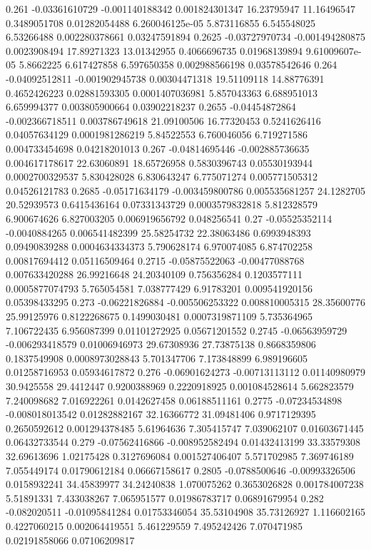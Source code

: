 {0.261 -0.03361610729 -0.001140188342 0.001824301347 16.23795947 11.16496547 0.3489051708 0.01282054488 6.260046125e-05 5.873116855 6.545548025 6.53266488 0.002280378661 0.03247591894
0.2625 -0.03727970734 -0.001494280875 0.0023908494 17.89271323 13.01342955 0.4066696735 0.01968139894 9.61009607e-05 5.8662225 6.617427858 6.597650358 0.002988566198 0.03578542646
0.264 -0.04092512811 -0.001902945738 0.00304471318 19.51109118 14.88776391 0.4652426223 0.02881593305 0.0001407036981 5.857043363 6.688951013 6.659994377 0.003805900664 0.03902218237
0.2655 -0.04454872864 -0.002366718511 0.003786749618 21.09100506 16.77320453 0.5241626416 0.04057634129 0.0001981286219 5.84522553 6.760046056 6.719271586 0.004733454698 0.04218201013
0.267 -0.04814695446 -0.002885736635 0.004617178617 22.63060891 18.65726958 0.5830396743 0.05530193944 0.0002700329537 5.830428028 6.830643247 6.775071274 0.005771505312 0.04526121783
0.2685 -0.05171634179 -0.003459800786 0.005535681257 24.1282705 20.52939573 0.6415436164 0.07331343729 0.0003579832818 5.812328579 6.900674626 6.827003205 0.006919656792 0.048256541
0.27 -0.05525352114 -0.0040884265 0.006541482399 25.58254732 22.38063486 0.6993948393 0.09490839288 0.0004634334373 5.790628174 6.970074085 6.874702258 0.00817694412 0.05116509464
0.2715 -0.05875522063 -0.00477088768 0.007633420288 26.99216648 24.20340109 0.756356284 0.1203577111 0.0005877074793 5.765054581 7.038777429 6.91783201 0.009541920156 0.05398433295
0.273 -0.06221826884 -0.005506253322 0.008810005315 28.35600776 25.99125976 0.8122268675 0.1499030481 0.0007319871109 5.735364965 7.106722435 6.956087399 0.01101272925 0.05671201552
0.2745 -0.06563959729 -0.006293418579 0.01006946973 29.67308936 27.73875138 0.8668359806 0.1837549908 0.0008973028843 5.701347706 7.173848899 6.989196605 0.01258716953 0.05934617872
0.276 -0.06901624273 -0.00713113112 0.01140980979 30.9425558 29.4412447 0.9200388969 0.2220918925 0.001084528614 5.662823579 7.240098682 7.016922261 0.0142627458 0.06188511161
0.2775 -0.07234534898 -0.008018013542 0.01282882167 32.16366772 31.09481406 0.9717129395 0.2650592612 0.001294378485 5.61964636 7.305415747 7.039062107 0.01603671445 0.06432733544
0.279 -0.07562416866 -0.008952582494 0.01432413199 33.33579308 32.69613696 1.02175428 0.3127696084 0.001527406407 5.571702985 7.369746189 7.055449174 0.01790612184 0.06667158617
0.2805 -0.0788500646 -0.00993326506 0.0158932241 34.45839977 34.24240838 1.070075262 0.3653026828 0.001784007238 5.51891331 7.433038267 7.065951577 0.01986783717 0.06891679954
0.282 -0.082020511 -0.01095841284 0.01753346054 35.53104908 35.73126927 1.116602165 0.4227060215 0.002064419551 5.461229559 7.495242426 7.070471985 0.02191858066 0.07106209817
}
